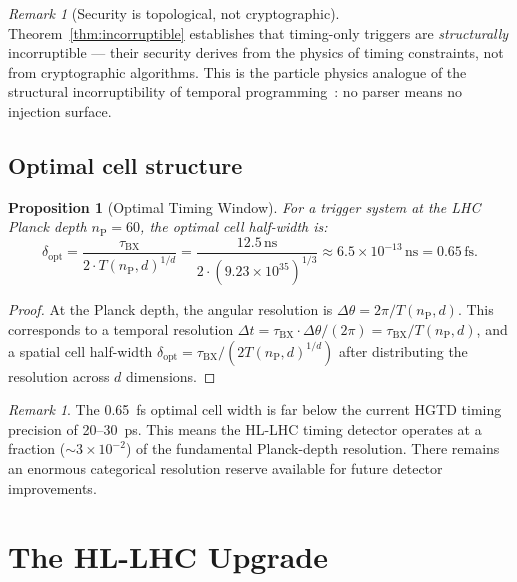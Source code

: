 \documentclass[twocolumn,10pt,a4paper]{article}
\theoremstyle{thmstyle}
\newtheorem{proposition}[theorem]{Proposition}
\theoremstyle{definition}
\theoremstyle{remark}
\newtheorem{remark}[theorem]{Remark}
\newcommand{\nP}{n_{\mathrm{P}}}
\begin{document}
\begin{remark}[Security is topological, not cryptographic]
Theorem~\ref{thm:incorruptible} establishes that timing-only triggers are
\emph{structurally} incorruptible — their security derives from the physics
of timing constraints, not from cryptographic algorithms. This is the
particle physics analogue of the structural incorruptibility of temporal
programming~\citep{companion:fundamentaltiming}: no parser means no
injection surface.
\end{remark}

\subsection{Optimal cell structure}

\begin{proposition}[Optimal Timing Window]
\label{prop:optimal}
For a trigger system at the LHC Planck depth $\nP = 60$, the optimal cell
half-width is:
\begin{equation}
\delta_{\mathrm{opt}} = \frac{\tau_{\mathrm{BX}}}{2 \cdot T(\nP, d)^{1/d}}
= \frac{12.5\,\mathrm{ns}}{2 \cdot (9.23\times 10^{35})^{1/3}}
\approx 6.5 \times 10^{-13}\,\mathrm{ns} = 0.65\,\mathrm{fs}.
\end{equation}
\end{proposition}

\begin{proof}
At the Planck depth, the angular resolution is
$\Delta\theta = 2\pi/T(\nP, d)$. This corresponds to a temporal resolution
$\Delta t = \tau_{\mathrm{BX}} \cdot \Delta\theta/(2\pi)
= \tau_{\mathrm{BX}}/T(\nP, d)$, and a spatial cell half-width
$\delta_{\mathrm{opt}} = \tau_{\mathrm{BX}}/(2T(\nP,d)^{1/d})$
after distributing the resolution across $d$ dimensions.
\end{proof}

\begin{remark}
The 0.65~fs optimal cell width is far below the current HGTD timing precision
of 20--30~ps. This means the HL-LHC timing detector operates at a fraction
($\sim 3\times 10^{-2}$) of the fundamental Planck-depth resolution. There
remains an enormous categorical resolution reserve available for future
detector improvements.
\end{remark}

\section{The HL-LHC Upgrade}
\label{sec:hllhc}
\end{document}

